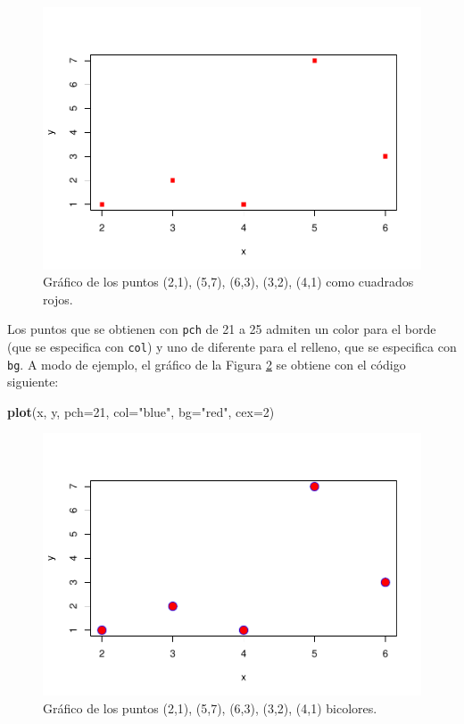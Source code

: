 \documentclass[
]{book}
\newenvironment{Shaded}{\begin{snugshade}}{\end{snugshade}}
\newcommand{\DataTypeTok}[1]{\textcolor[rgb]{0.13,0.29,0.53}{#1}}
\newcommand{\DecValTok}[1]{\textcolor[rgb]{0.00,0.00,0.81}{#1}}
\newcommand{\KeywordTok}[1]{\textcolor[rgb]{0.13,0.29,0.53}{\textbf{#1}}}
\newcommand{\NormalTok}[1]{#1}
\newcommand{\StringTok}[1]{\textcolor[rgb]{0.31,0.60,0.02}{#1}}
\theoremstyle{definition}
\theoremstyle{definition}
\theoremstyle{definition}
\theoremstyle{remark}
\begin{document}
\begin{figure}

{\centering \includegraphics[width=0.9\linewidth]{07chap06_Graficos_I_files/figure-latex/F402051-1} 

}

\caption{Gráfico de los puntos (2,1), (5,7), (6,3), (3,2), (4,1) como cuadrados rojos.}\label{fig:F402051}
\end{figure}

Los puntos que se obtienen con \texttt{pch} de 21 a 25 admiten un color para el borde (que se especifica con \texttt{col}) y uno de diferente para el relleno, que se especifica con \texttt{bg}. A modo de ejemplo, el gráfico de la Figura \ref{fig:F402052} se obtiene con el código siguiente:

\begin{Shaded}
\begin{Highlighting}[]
\KeywordTok{plot}\NormalTok{(x, y, }\DataTypeTok{pch=}\DecValTok{21}\NormalTok{, }\DataTypeTok{col=}\StringTok{"blue"}\NormalTok{, }\DataTypeTok{bg=}\StringTok{"red"}\NormalTok{, }\DataTypeTok{cex=}\DecValTok{2}\NormalTok{)}
\end{Highlighting}
\end{Shaded}

\begin{figure}

{\centering \includegraphics[width=0.9\linewidth]{07chap06_Graficos_I_files/figure-latex/F402052-1} 

}

\caption{Gráfico de los puntos (2,1), (5,7), (6,3), (3,2), (4,1) bicolores.}\label{fig:F402052}
\end{figure}
\end{document}
